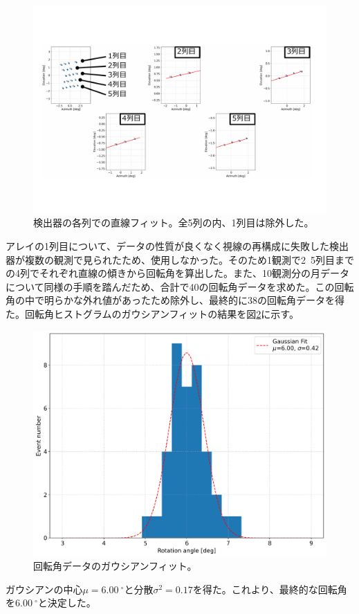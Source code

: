 \begin{figure}[htbp]
  \centering
  \includegraphics[width=1.05\columnwidth]{5_alignment/figs/angle_cal_lines.pdf}
  \caption{検出器の各列での直線フィット。全5列の内、1列目は除外した。}
  \label{linear_fit}
\end{figure}
アレイの1列目について、データの性質が良くなく視線の再構成に失敗した検出器が複数の観測で見られたため、使用しなかった。そのため1観測で2~5列目までの4列でそれぞれ直線の傾きから回転角を算出した。また、10観測分の月データについて同様の手順を踏んだため、合計で40の回転角データを求めた。この回転角の中で明らかな外れ値があったため除外し、最終的に38の回転角データを得た。回転角ヒストグラムのガウシアンフィットの結果を図\ref{gaussian_fit}に示す。
\begin{figure}[htbp]
  \centering
  \includegraphics[width=0.8\columnwidth]{5_alignment/figs/hist_rotation_angle2.png}
  \caption{回転角データのガウシアンフィット。}
  \label{gaussian_fit}
\end{figure}
ガウシアンの中心$\mu=\SI{6.00}{^{\circ}}$と分散$\sigma^{2}=0.17$を得た。これより、最終的な回転角を$\SI{6.00}{^{\circ}}$と決定した。

